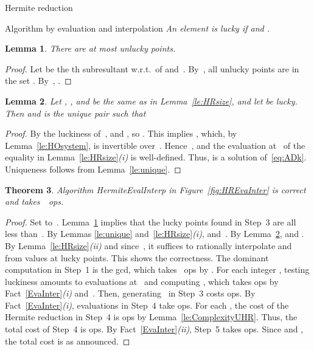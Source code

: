 \documentclass{sig-alt-full}
\newtheorem{lemma}{Lemma}
\newtheorem{theorem}[lemma]{Theorem}
\begin{document}
\begin{section}{Hermite reduction}
\begin{subsection}{Algorithm by evaluation and interpolation}
\medskip{}
\emph{An element  is \emph{lucky\/} if\/
 and .}
\begin{lemma}\label{le:unlucky}
There are at most  unlucky points.
\end{lemma}
\begin{proof}
Let  be the th subresultant w.r.t.\  of 
and~.
By~\cite[Corollary 5.5]{Gerhard2004}, all
unlucky points are in the set .
By~\cite[Corollary 3.2\emph{(ii)}]{Gerhard2004}, .
\end{proof}
\begin{lemma}\label{le:commutative}
Let , , and  be the same
as in Lemma~\ref{le:HRsize}, and let  be lucky.
Then  and 
is the unique pair such that

\end{lemma}
\begin{proof}
By the luckiness of~,  and
, so .
This implies , which, by
Lemma~\ref{le:HOsystem}, is invertible over~.
Hence~,
and the evaluation at~ of the equality in
Lemma~\ref{le:HRsize}\emph{(i)\/} is well-defined.
Thus,  is a solution of~\eqref{eq:ADk}.
Uniqueness follows from Lemma~\ref{le:unique}.
\end{proof}
\begin{theorem}\label{th:BHR}
Algorithm \textsf{HermiteEvalInterp} in Figure~\ref{fig:HREvaInter} is
correct and takes~~ops.
\end{theorem}
\begin{proof}
Set  to~. Lemma~\ref{le:unlucky} implies that
the  lucky points found in Step~3 are all less
than~.
By Lemmas \ref{le:unique} and~\ref{le:HRsize}\emph{(i)}, 
and~.
By Lemma~\ref{le:commutative},  and
.
By Lemma~\ref{le:HRsize}\emph{(ii)\/} and
since~, it suffices to rationally interpolate
 and~ from values at  lucky points.
This shows the correctness.
The dominant computation in Step~1 is the gcd, which takes
~ops by \cite[Cor.~11.9]{MCA2003}.
For each integer , testing luckiness amounts to evaluations at~ and
computing , which takes
 ops by Fact~\ref{EvaInter}\emph{(i)\/}
and~\cite[Cor.~11.6]{MCA2003}. Then,
generating~ in Step~3 costs  ops.
By Fact~\ref{EvaInter}\emph{(i)}, evaluations in Step~4 take
 ops. For each , the cost of
the Hermite reduction in Step~4 is  ops by
Lemma~\ref{le:ComplexityUHR}. Thus, the total cost of Step~4 is
 ops. By
Fact~\ref{EvaInter}\emph{(ii)}, Step~5
takes  ops.
Since  and ,
the total cost is as announced.
\end{proof}
\begin{figure}
\end{figure}
\end{subsection}
\end{section}
\end{document}
